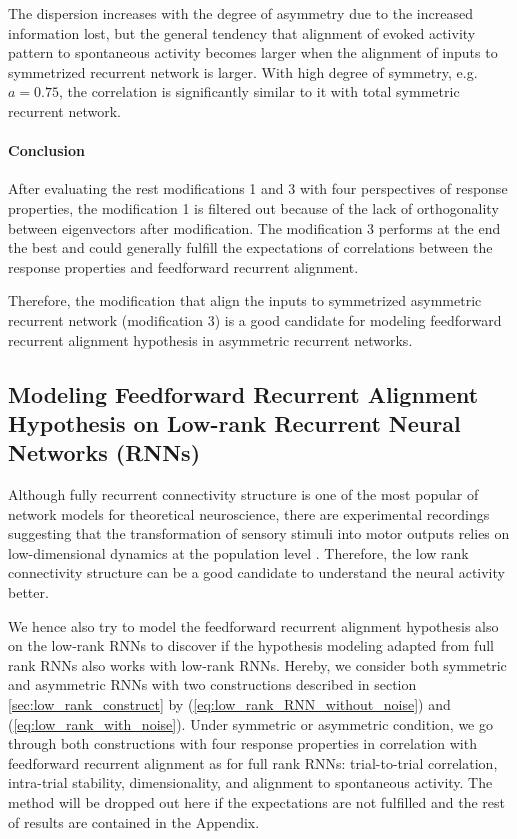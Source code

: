 \documentclass[11pt]{article}
\begin{document}
	The dispersion increases with the degree of asymmetry due to the increased information lost, but the general tendency that alignment of evoked activity pattern to spontaneous activity becomes larger when the alignment of inputs to symmetrized recurrent network is larger. With high degree of symmetry, e.g. $a = 0.75$, the correlation is significantly similar to it with total symmetric recurrent network.
	
	\paragraph{Conclusion}
	After evaluating the rest modifications 1 and 3 with four perspectives of response properties, the modification 1 is filtered out because of the lack of orthogonality between eigenvectors after modification. The modification 3 performs at the end the best and could generally fulfill the expectations of correlations between the response properties and feedforward recurrent alignment. 
	
	Therefore, the modification that align the inputs to symmetrized asymmetric recurrent network (modification 3) is a good candidate for modeling feedforward recurrent alignment hypothesis in asymmetric recurrent networks.
	
	\clearpage
	\subsection{Modeling Feedforward Recurrent Alignment Hypothesis on Low-rank Recurrent Neural Networks (RNNs)}
	Although fully recurrent connectivity structure is one of the most popular of network models for theoretical neuroscience, there are experimental recordings suggesting that the transformation of sensory stimuli into motor outputs relies on low-dimensional dynamics at the population level \cite{mastrogiuseppe2018linking}. Therefore, the low rank connectivity structure can be a good candidate to understand the neural activity better. 
	
	We hence also try to model the feedforward recurrent alignment hypothesis also on the low-rank RNNs to discover if the hypothesis modeling adapted from full rank RNNs also works with low-rank RNNs. 
	Hereby, we consider both symmetric and asymmetric RNNs with two constructions described in section \ref{sec:low_rank_construct} by (\ref{eq:low_rank_RNN_without_noise}) and (\ref{eq:low_rank_with_noise}). Under symmetric or asymmetric condition, we go through both constructions with four response properties in correlation with feedforward recurrent alignment as for full rank RNNs: trial-to-trial correlation, intra-trial stability, dimensionality, and alignment to spontaneous activity. The method will be dropped out here if the expectations are not fulfilled and the rest of results are contained in the Appendix. %
	
\end{document}
